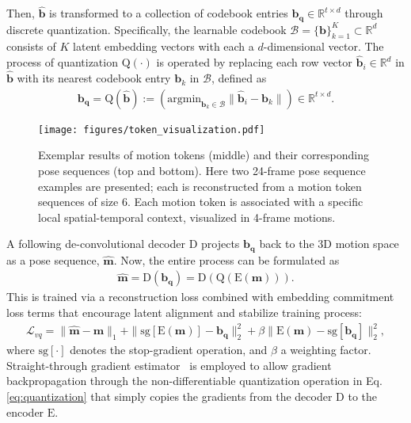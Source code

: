 \documentclass[runningheads]{llncs}
\newcommand{\beforefigcaption}{\vspace{-9mm}}
\newcommand{\afterfigcaption}{\vspace{-5mm}}
\begin{document}
Then, $\mathbf{\hat{b}}$ is transformed to a collection of codebook entries $\mathbf{b}_{\mathbf{q}}\in \mathbb{R}^{t\times d}$ through discrete quantization. Specifically, the learnable codebook $\mathscr{B}=\{\mathbf{b}\}_{k=1}^K\subset \mathbb{R}^d$ consists of $K$ latent embedding vectors with each a $d$-dimensional vector. The process of quantization $\mathrm{Q}(\cdot)$ is operated by replacing each 
row vector $\mathbf{\hat{b}}_i\in \mathbb{R}^d$ in $\mathbf{\hat{b}}$ with its nearest codebook entry $\mathbf{b}_k$ in $\mathscr{B}$, defined as
\begin{align}
\label{eq:quantization}
    \mathbf{b}_{\mathbf{q}} = \mathrm{Q}(\mathbf{\hat{b}}):=\left(\mathrm{argmin}_{\mathbf{b}_k \in \mathscr{B}} \|\mathbf{\hat{b}}_i - \mathbf{b}_k\| \right) \in \mathbb{R}^{t\times d}.
\end{align}

\begin{figure*}[t]
	\centering
	\texttt{[image: figures/token\_visualization.pdf]}
		 \beforefigcaption
	\caption{Exemplar results of motion tokens (middle) and their corresponding pose sequences (top and bottom). Here two 24-frame pose sequence examples are presented; each is reconstructed from a motion token sequences of size 6. Each motion token is associated with a specific local spatial-temporal context, visualized in 4-frame motions.}
	\label{fig:token_visualization}
	 \afterfigcaption
\end{figure*}

A following de-convolutional decoder $\mathrm{D}$ projects $\mathbf{b}_{\mathbf{q}}$ back to the 3D motion space as a pose sequence, $\hat{\mathbf{m}}$. Now, the entire process can be formulated as
\begin{align}
    \hat{\mathbf{m}} = \mathrm{D}(\mathbf{b}_\mathbf{q}) = \mathrm{D}(\mathrm{Q}(\mathrm{E}(\mathbf{m}))).
\end{align}
This is trained via a reconstruction loss combined with embedding commitment loss terms that encourage latent alignment and stabilize training process:
\begin{align}
    \mathcal{L}_{vq} = \|\mathbf{\hat{m}} - \mathbf{m}\|_1 + \|\mathrm{sg}[\mathrm{E}(\mathbf{m})] - \mathbf{b}_\mathbf{q}\|_2^2 + \beta\|\mathrm{E}(\mathbf{m}) - \mathrm{sg}[\mathbf{b}_\mathbf{q}]\|_2^2,
\end{align}
where $\mathrm{sg}[\cdot]$ denotes the stop-gradient operation, and $\beta$ a weighting factor. Straight-through gradient estimator~\cite{van2017neural} is employed to allow gradient backpropagation through the non-differentiable quantization operation in Eq.\eqref{eq:quantization} that simply copies the gradients from the decoder $\mathrm{D}$ to the encoder $\mathrm{E}$. 
\end{document}
